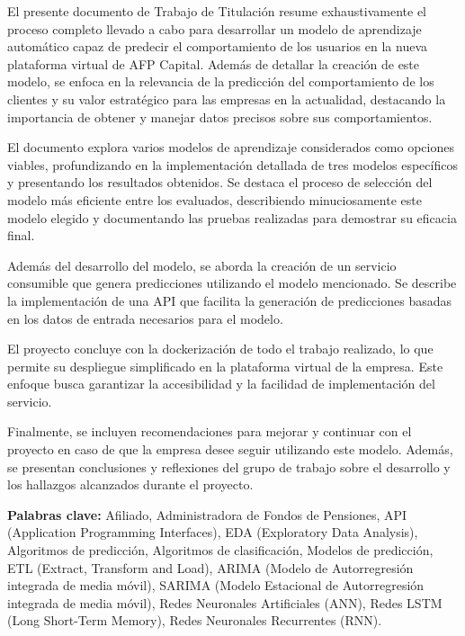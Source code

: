 El presente documento de Trabajo de Titulación resume exhaustivamente el proceso completo llevado a cabo para desarrollar un modelo de aprendizaje automático capaz de predecir el comportamiento de los usuarios en la nueva plataforma virtual de AFP Capital. Además de detallar la creación de este modelo, se enfoca en la relevancia de la predicción del comportamiento de los clientes y su valor estratégico para las empresas en la actualidad, destacando la importancia de obtener y manejar datos precisos sobre sus comportamientos.

El documento explora varios modelos de aprendizaje considerados como opciones viables, profundizando en la implementación detallada de tres modelos específicos y presentando los resultados obtenidos. Se destaca el proceso de selección del modelo más eficiente entre los evaluados, describiendo minuciosamente este modelo elegido y documentando las pruebas realizadas para demostrar su eficacia final.

Además del desarrollo del modelo, se aborda la creación de un servicio consumible que genera predicciones utilizando el modelo mencionado. Se describe la implementación de una API que facilita la generación de predicciones basadas en los datos de entrada necesarios para el modelo.

El proyecto concluye con la dockerización de todo el trabajo realizado, lo que permite su despliegue simplificado en la plataforma virtual de la empresa. Este enfoque busca garantizar la accesibilidad y la facilidad de implementación del servicio.

Finalmente, se incluyen recomendaciones para mejorar y continuar con el proyecto en caso de que la empresa desee seguir utilizando este modelo. Además, se presentan conclusiones y reflexiones del grupo de trabajo sobre el desarrollo y los hallazgos alcanzados durante el proyecto.

\textbf{Palabras clave:}  Afiliado, Administradora de Fondos de Pensiones, API (Application Programming Interfaces), EDA (Exploratory Data Analysis), Algoritmos de predicción, Algoritmos de clasificación, Modelos de predicción, ETL (Extract, Transform and Load), ARIMA (Modelo de Autorregresión integrada de media móvil), SARIMA (Modelo Estacional de Autorregresión integrada de media móvil), Redes Neuronales Artificiales (ANN), Redes LSTM (Long Short-Term Memory), Redes Neuronales Recurrentes (RNN).